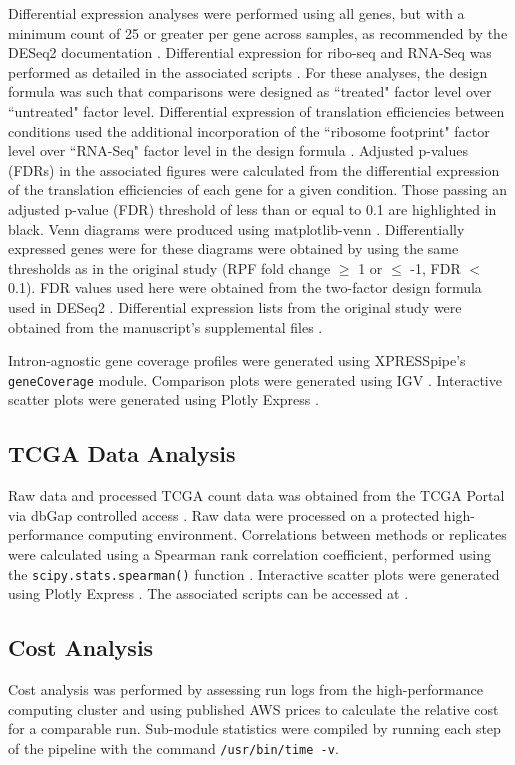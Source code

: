 \documentclass[10pt, oneside]{article}
\begin{document}
Differential expression analyses were performed using all genes, but with a minimum count of 25 or greater per gene across samples, as recommended by the DESeq2 documentation \cite{deseq2}. Differential expression for ribo-seq and RNA-Seq was performed as detailed in the associated scripts \cite{manuscript}. For these analyses, the design formula was such that comparisons were designed as ``treated" factor level over ``untreated" factor level. Differential expression of translation efficiencies between conditions used the additional incorporation of the ``ribosome footprint" factor level over ``RNA-Seq" factor level in the design formula \cite{deseq2,isrib_riboseq,ingolia_meth}. Adjusted p-values (FDRs) in the associated figures were calculated from the differential expression of the translation efficiencies of each gene for a given condition. Those passing an adjusted p-value (FDR) threshold of less than or equal to 0.1 are highlighted in black. Venn diagrams were produced using matplotlib-venn \cite{matvenn}. Differentially expressed genes were for these diagrams were obtained by using the same thresholds as in the original study (RPF fold change $\geq$ 1 or $\leq$ -1, FDR $<$ 0.1). FDR values used here were obtained from the two-factor design formula used in DESeq2 \cite{deseq2}. Differential expression lists from the original study were obtained from the manuscript's supplemental files \cite{isrib_riboseq}.\par

Intron-agnostic gene coverage profiles were generated using XPRESSpipe's \texttt{geneCoverage} module. Comparison plots were generated using IGV \cite{igv}. Interactive scatter plots were generated using Plotly Express \cite{plotly}. \\

\subsection*{TCGA Data Analysis}
Raw data and processed TCGA count data was obtained from the TCGA Portal \cite{tcga} via dbGap controlled access \cite{dbgap}. Raw data were processed on a protected high-performance computing environment. Correlations between methods or replicates were calculated using a Spearman rank correlation coefficient, performed using the \texttt{scipy.stats.spearman()} function \cite{spearman_rnaseq}. Interactive scatter plots were generated using Plotly Express \cite{plotly}. The associated scripts can be accessed at \cite{manuscript}. \\


\subsection*{Cost Analysis}
Cost analysis was performed by assessing run logs from the high-performance computing cluster and using published AWS prices \cite{aws_ec2, aws_s3} to calculate the relative cost for a comparable run. Sub-module statistics were compiled by running each step of the pipeline with the command \texttt{/usr/bin/time -v}.\\



\end{document}
